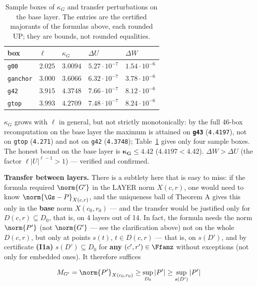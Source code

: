 \begin{table}[ht]
\centering
\caption{Sample boxes of $\kappa_G$ and transfer perturbations on the base layer.
The entries are the certified majorants of the formulas above, each rounded UP;
they are bounds, not rounded equalities.}
\label{tab:kappa-samples}
\begin{tabular}{lllll}
\hline
box & $\ell$ & $\kappa_G$ & $\Delta U$ & $\Delta W$ \\
\hline
\texttt{g00} & $2.025$ & $3.0094$ & $5.27\cdot 10^{-7}$ & $1.54\cdot 10^{-6}$ \\
\texttt{ganchor} & $3.000$ & $3.6066$ & $6.32\cdot 10^{-7}$ & $3.78\cdot 10^{-6}$ \\
\texttt{g42} & $3.915$ & $4.3748$ & $7.66\cdot 10^{-7}$ & $8.12\cdot 10^{-6}$ \\
\texttt{gtop} & $3.993$ & $4.2709$ & $7.48\cdot 10^{-7}$ & $8.24\cdot 10^{-6}$ \\
\hline
\end{tabular}
\end{table}

$\kappa_G$ grows with $\ell$ in general, but not strictly monotonically: by the full 46-box
recomputation on the base layer the maximum is attained on \textbf{\texttt{g43}} (\texttt{4.4197}), not on
\texttt{gtop} (\texttt{4.271}) and not on \texttt{g42} (\texttt{4.3748}); Table~\ref{tab:kappa-samples} gives only four sample boxes.
The honest bound on the base layer is $\mathbf{\kappa_G \le 4.42}$ ($4.4197 < 4.42$). $\Delta W > \Delta U$
(the factor $\ell|U|^{\ell-1} > 1$) --- verified and confirmed.

\textbf{Transfer between layers.} There is a subtlety here that is easy to miss:
if the formula required $\norm{G'}$ in the LAYER norm $X(c,r)$, one would need
to know $\norm{\Gs-P}_{X(c,r)}$, and the uniqueness ball of Theorem A gives this only in the
\textbf{base} norm $X(c_{0},r_{0})$ --- and the transfer would be justified only for
$D(c,r) \subseteq D_{0}$, that is, on 4 layers out of 14. In fact, the formula needs the norm $\norm{P'}$
(not $\norm{G'}$ --- see the clarification above) not on the whole $D(c,r)$, but only at points
$s(t)$, $t \in D(c,r)$ --- that is, on $s(D')$, and by certificate \textbf{(I1a)}
$s(D') \subseteq D_{0}$ for \textbf{any} $(c',r') \in \Ffamz$ without exceptions (not only for embedded ones).
It therefore suffices

\[
M_{G'} = \norm{P'}_{X(c_{0},r_{0})} \ge \sup_{D_{0}} |P'| \ge \sup_{s(D')} |P'|
\]


